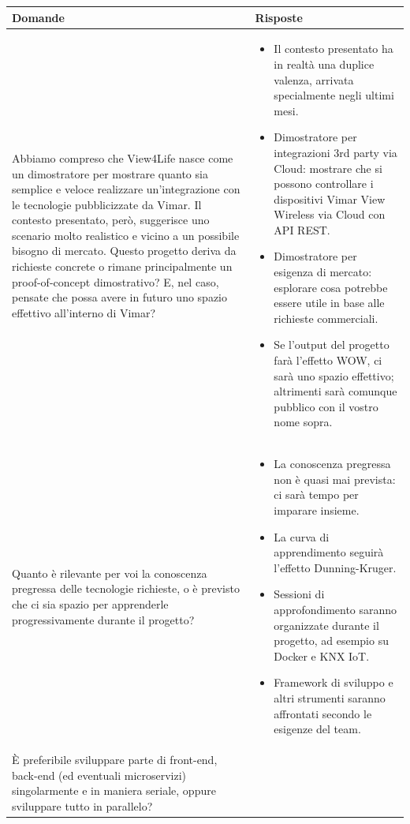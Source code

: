 \documentclass[a4paper,11pt]{article}
\begin{document}
{\footnotesize
\begin{tabularx}{\textwidth}{|>{\raggedright\arraybackslash}X|>{\raggedright\arraybackslash}X|}
\hline
\textbf{Domande} & \textbf{Risposte} \\
\hline
Abbiamo compreso che View4Life nasce come un dimostratore per mostrare quanto sia semplice e veloce realizzare un'integrazione con le tecnologie pubblicizzate da Vimar. Il contesto presentato, però, suggerisce uno scenario molto realistico e vicino a un possibile bisogno di mercato. Questo progetto deriva da richieste concrete o rimane principalmente un proof-of-concept dimostrativo? E, nel caso, pensate che possa avere in futuro uno spazio effettivo all'interno di Vimar? 
&
\begin{itemize}
\item Il contesto presentato ha in realtà una duplice valenza, arrivata specialmente negli ultimi mesi.
\item Dimostratore per integrazioni 3rd party via Cloud: mostrare che si possono controllare i dispositivi Vimar View Wireless via Cloud con API REST.
\item Dimostratore per esigenza di mercato: esplorare cosa potrebbe essere utile in base alle richieste commerciali.
\item Se l'output del progetto farà l'effetto WOW, ci sarà uno spazio effettivo; altrimenti sarà comunque pubblico con il vostro nome sopra.
\end{itemize} \\
\hline
Quanto è rilevante per voi la conoscenza pregressa delle tecnologie richieste, o è previsto che ci sia spazio per apprenderle progressivamente durante il progetto?
&
\begin{itemize}
\item La conoscenza pregressa non è quasi mai prevista: ci sarà tempo per imparare insieme.
\item La curva di apprendimento seguirà l'effetto Dunning-Kruger.
\item Sessioni di approfondimento saranno organizzate durante il progetto, ad esempio su Docker e KNX IoT.
\item Framework di sviluppo e altri strumenti saranno affrontati secondo le esigenze del team.
\end{itemize} \\
\hline
È preferibile sviluppare parte di front-end, back-end (ed eventuali microservizi) singolarmente e in maniera seriale, oppure sviluppare tutto in parallelo?
&
\begin{itemize}

\end{itemize}
\end{tabularx}}
\end{document}
